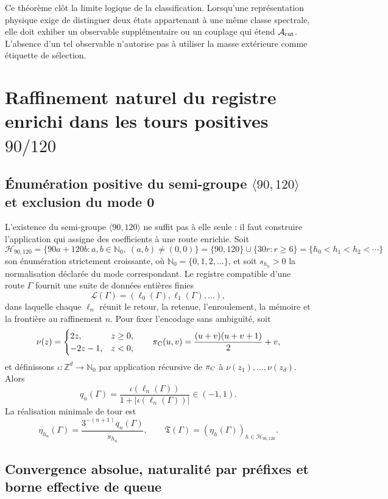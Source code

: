 Ce théorème clôt la limite logique de la classification. Lorsqu'une
représentation physique exige de distinguer deux états appartenant à une même
classe spectrale, elle doit exhiber un observable supplémentaire ou un couplage qui
étend \(\mathcal A_{\rm rut}\). L'absence d'un tel observable n'autorise pas à
utiliser la masse extérieure comme étiquette de sélection.

\section{Raffinement naturel du registre enrichi dans les tours positives \texorpdfstring{\(90/120\)}{90/120}}

\subsection{Énumération positive du semi-groupe \texorpdfstring{\(\langle90,120\rangle\)}{<90,120>} et exclusion du mode 0}

L'existence du semi-groupe \(\langle90,120\rangle\) ne suffit pas à elle seule :
il faut construire l'application qui assigne des coefficients à une route enrichie. Soit
\[
 \mathcal H_{90,120}
 =\{90a+120b:a,b\in\mathbb N_0,\ (a,b)\ne(0,0)\}
 =\{90,120\}\cup\{30r:r\geq6\}
 =\{h_0<h_1<h_2<\cdots\}
\]
son énumération strictement croissante, où \(\mathbb N_0=\{0,1,2,\ldots\}\),
et soit \(s_{h_n}>0\) la normalisation déclarée du mode correspondant. Le
registre compatible d'une route
\(\Gamma\) fournit une suite de données entières finies
\[
 \mathcal L(\Gamma)=(\ell_0(\Gamma),\ell_1(\Gamma),\ldots),
\]
dans laquelle chaque \(\ell_n\) réunit le retour, la retenue, l'enroulement, la mémoire et la frontière
au raffinement \(n\). Pour fixer l'encodage sans ambiguïté, soit
\[
 \nu(z)=
 \begin{cases}2z,&z\geq0,\\-2z-1,&z<0,\end{cases}
 \qquad
 \pi_{\rm C}(u,v)=\frac{(u+v)(u+v+1)}2+v,
\]
et définissons \(\iota:\mathbb Z^d\to\mathbb N_0\) par application récursive de
\(\pi_{\rm C}\) à \(\nu(z_1),\ldots,\nu(z_d)\). Alors
\[
 q_n(\Gamma)
 =\frac{\iota(\ell_n(\Gamma))}
 {1+|\iota(\ell_n(\Gamma))|}\in(-1,1).
\]
La réalisation minimale de tour est
\[
 \eta_{h_n}(\Gamma)
 =\frac{3^{-(n+1)}q_n(\Gamma)}{s_{h_n}},
 \qquad
 \mathfrak T(\Gamma)
 =(\eta_h(\Gamma))_{h\in\mathcal H_{90,120}}.
\]

\subsection{Convergence absolue, naturalité par préfixes et borne effective de queue}

